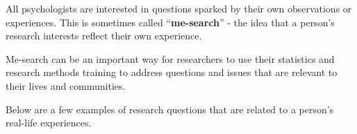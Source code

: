 \documentclass[
  letterpaper,
  DIV=11,
  numbers=noendperiod,
  oneside]{scrreprt}
\begin{document}

All psychologists are interested in questions sparked by their own
observations or experiences. This is sometimes called
``\textbf{me-search}'' - the idea that a person's research interests
reflect their own experience.

Me-search can be an important way for researchers to use their
statistics and research methods training to address questions and issues
that are relevant to their lives and communities.

Below are a few examples of research questions that are related to a
person's real-life experiences.
\end{document}
